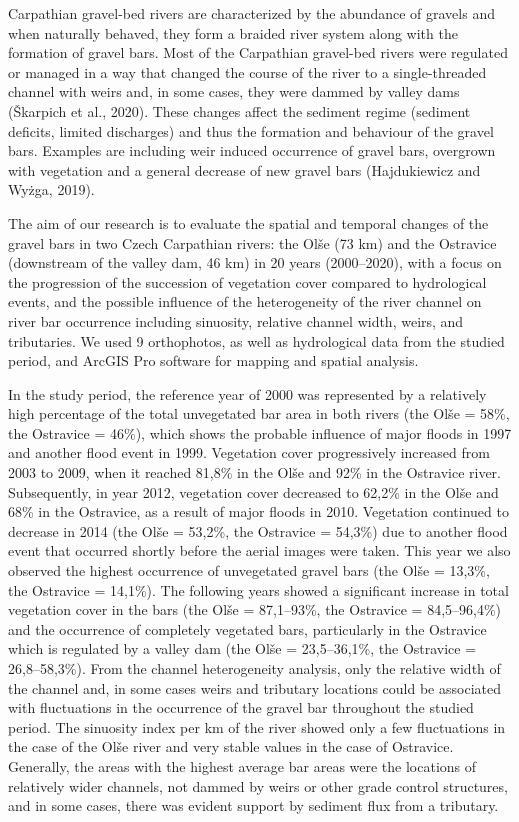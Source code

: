 {Carpathian gravel-bed rivers are characterized by the abundance of gravels and when naturally behaved, they form a braided river system along with the formation of gravel bars. Most of the Carpathian gravel-bed rivers were regulated or managed in a way that changed the course of the river to a single-threaded channel with weirs and, in some cases, they were dammed by valley dams (Škarpich et al., 2020). These changes affect the sediment regime (sediment deficits, limited discharges) and thus the formation and behaviour of the gravel bars. Examples are including weir induced occurrence of gravel bars, overgrown with vegetation and a general decrease of new gravel bars (Hajdukiewicz and Wyżga, 2019).

The aim of our research is to evaluate the spatial and temporal changes of the gravel bars in two Czech Carpathian rivers: the Olše (73 km) and the Ostravice (downstream of the valley dam, 46 km) in 20 years (2000–2020), with a focus on the progression of the succession of vegetation cover compared to hydrological events, and the possible influence of the heterogeneity of the river channel on river bar occurrence including sinuosity, relative channel width, weirs, and tributaries. We used 9 orthophotos, as well as hydrological data from the studied period, and ArcGIS Pro software for mapping and spatial analysis. 

In the study period, the reference year of 2000 was represented by a relatively high percentage of the total unvegetated bar area in both rivers (the Olše = 58\%, the Ostravice = 46\%), which shows the probable influence of major floods in 1997 and another flood event in 1999. Vegetation cover progressively increased from 2003 to 2009, when it reached 81,8\% in the Olše and 92\% in the Ostravice river. Subsequently, in year 2012, vegetation cover decreased to 62,2\% in the Olše and 68\% in the Ostravice, as a result of major floods in 2010. Vegetation continued to decrease in 2014 (the Olše = 53,2\%, the Ostravice = 54,3\%) due to another flood event that occurred shortly before the aerial images were taken. This year we also observed the highest occurrence of unvegetated gravel bars (the Olše = 13,3\%, the Ostravice = 14,1\%). The following years showed a significant increase in total vegetation cover in the bars (the Olše = 87,1--93\%, the Ostravice = 84,5--96,4\%) and the occurrence of completely vegetated bars, particularly in the Ostravice which is regulated by a valley dam (the Olše = 23,5--36,1\%, the Ostravice = 26,8--58,3\%). From the channel heterogeneity analysis, only the relative width of the channel and, in some cases weirs and tributary locations could be associated with fluctuations in the occurrence of the gravel bar throughout the studied period. The sinuosity index per km of the river showed only a few fluctuations in the case of the Olše river and very stable values in the case of Ostravice. Generally, the areas with the highest average bar areas were the locations of relatively wider channels, not dammed by weirs or other grade control structures, and in some cases, there was evident support by sediment flux from a tributary.

}
